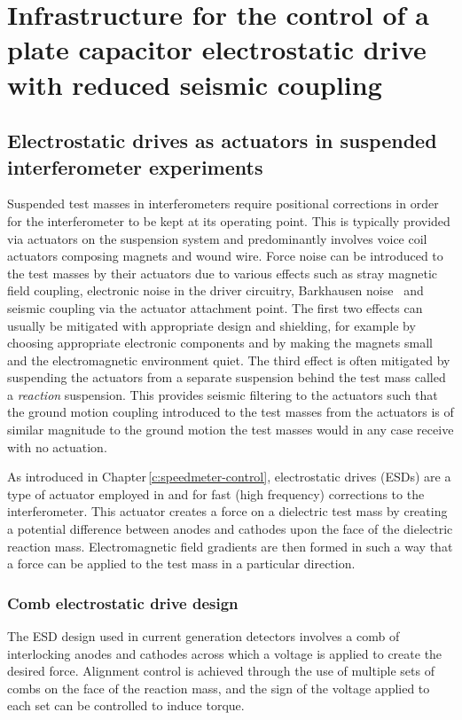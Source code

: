 \chapter{\label{c:esd-concept}Infrastructure for the control of a plate capacitor electrostatic drive with reduced seismic coupling}

\section{Electrostatic drives as actuators in suspended interferometer experiments}
Suspended test masses in interferometers require positional corrections in order for the interferometer to be kept at its operating point. This is typically provided via actuators on the suspension system and predominantly involves voice coil actuators composing magnets and wound wire. Force noise can be introduced to the test masses by their actuators due to various effects such as stray magnetic field coupling, electronic noise in the driver circuitry, Barkhausen noise~\cite{Weiss2008} and seismic coupling via the actuator attachment point. The first two effects can usually be mitigated with appropriate design and shielding, for example by choosing appropriate electronic components and by making the magnets small and the electromagnetic environment quiet. The third effect is often mitigated by suspending the actuators from a separate suspension behind the test mass called a \emph{reaction} suspension. This provides seismic filtering to the actuators such that the ground motion coupling introduced to the test masses from the actuators is of similar magnitude to the ground motion the test masses would in any case receive with no actuation.

As introduced in Chapter\,\ref{c:speedmeter-control}, electrostatic drives (\glspl{ESD}) are a type of actuator employed in \GEO{} and \ALIGO{} for fast (high frequency) corrections to the interferometer. This actuator creates a force on a dielectric test mass by creating a potential difference between anodes and cathodes upon the face of the dielectric reaction mass. Electromagnetic field gradients are then formed in such a way that a force can be applied to the test mass in a particular direction.

\subsection{Comb electrostatic drive design}
The \gls{ESD} design used in current generation detectors involves a comb of interlocking anodes and cathodes across which a voltage is applied to create the desired force. Alignment control is achieved through the use of multiple sets of combs on the face of the reaction mass, and the sign of the voltage applied to each set can be controlled to induce torque.


